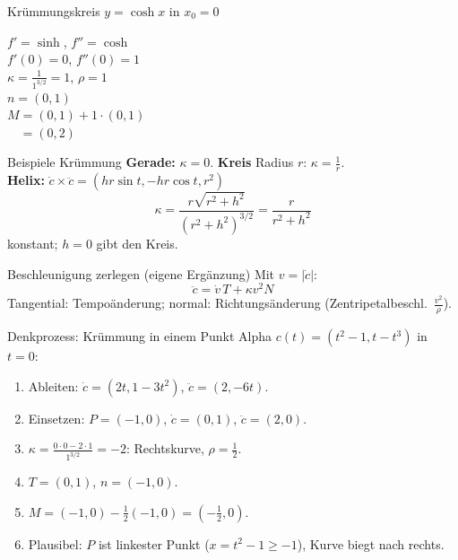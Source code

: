 \documentclass[a4paper, fontsize=7pt]{scrartcl}
\begin{document}
\begin{subbox}{Krümmungskreis $y = \cosh x$ in $x_0 = 0$}
\begin{minipage}{0.48\linewidth}
$f' = \sinh$, $f'' = \cosh$\\
$f'(0) = 0$, $f''(0) = 1$\\
$\kappa = \frac{1}{1^{3/2}} = 1$, $\rho = 1$\\
$n = (0, 1)$\\
$M = (0, 1) + 1 \cdot (0, 1)$\\
$\phantom{M} = (0, 2)$
\end{minipage}\hfill
\begin{minipage}{0.48\linewidth}
\centering
{}
\end{minipage}
\end{subbox}

\begin{subbox}{Beispiele Krümmung}
\textbf{Gerade:} $\kappa = 0$. \quad \textbf{Kreis} Radius $r$: $\kappa = \frac{1}{r}$.\\
\textbf{Helix:} $\dot c \times \ddot c = (hr\sin t, -hr\cos t, r^2)$
$$\kappa = \frac{r\sqrt{r^2 + h^2}}{(r^2 + h^2)^{3/2}} = \frac{r}{r^2 + h^2}$$
konstant; $h = 0$ gibt den Kreis.
\end{subbox}

\begin{subbox}{Beschleunigung zerlegen (eigene Ergänzung)}
Mit $v = |\dot c|$:
$$\ddot c = \dot v\, T + \kappa v^2 N$$
Tangential: Tempoänderung; normal: Richtungsänderung
(Zentripetalbeschl.\ $\frac{v^2}{\rho}$).
\end{subbox}

\begin{subbox}{Denkprozess: Krümmung in einem Punkt}
Alpha $c(t) = (t^2 - 1, t - t^3)$ in $t = 0$:
\begin{enumerate}
    \item Ableiten: $\dot c = (2t, 1 - 3t^2)$, $\ddot c = (2, -6t)$.
    \item Einsetzen: $P = (-1, 0)$, $\dot c = (0, 1)$, $\ddot c = (2, 0)$.
    \item $\kappa = \frac{0 \cdot 0 - 2 \cdot 1}{1^{3/2}} = -2$: Rechtskurve,
          $\rho = \frac{1}{2}$.
    \item $T = (0, 1)$, $n = (-1, 0)$.
    \item $M = (-1, 0) - \frac{1}{2}(-1, 0) = (-\frac{1}{2}, 0)$.
    \item Plausibel: $P$ ist linkester Punkt ($x = t^2 - 1 \ge -1$), Kurve
          biegt nach rechts.
\end{enumerate}
\end{subbox}
\end{document}
